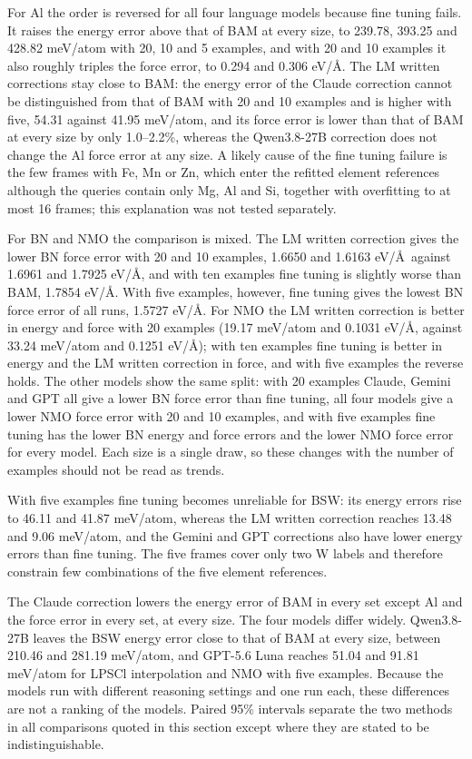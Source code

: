 For Al the order is reversed for all four language models because fine tuning fails. It raises the energy error above that of BAM at every size, to 239.78, 393.25 and 428.82 meV/atom with 20, 10 and 5 examples, and with 20 and 10 examples it also roughly triples the force error, to 0.294 and 0.306 eV/\AA. The LM written corrections stay close to BAM: the energy error of the Claude correction cannot be distinguished from that of BAM with 20 and 10 examples and is higher with five, 54.31 against 41.95 meV/atom, and its force error is lower than that of BAM at every size by only 1.0--2.2\%, whereas the Qwen3.8-27B correction does not change the Al force error at any size. A likely cause of the fine tuning failure is the few frames with Fe, Mn or Zn, which enter the refitted element references although the queries contain only Mg, Al and Si, together with overfitting to at most 16 frames; this explanation was not tested separately.

For BN and NMO the comparison is mixed. The LM written correction gives the lower BN force error with 20 and 10 examples, 1.6650 and 1.6163 eV/\AA\ against 1.6961 and 1.7925 eV/\AA, and with ten examples fine tuning is slightly worse than BAM, 1.7854 eV/\AA. With five examples, however, fine tuning gives the lowest BN force error of all runs, 1.5727 eV/\AA. For NMO the LM written correction is better in energy and force with 20 examples (19.17 meV/atom and 0.1031 eV/\AA, against 33.24 meV/atom and 0.1251 eV/\AA); with ten examples fine tuning is better in energy and the LM written correction in force, and with five examples the reverse holds. The other models show the same split: with 20 examples Claude, Gemini and GPT all give a lower BN force error than fine tuning, all four models give a lower NMO force error with 20 and 10 examples, and with five examples fine tuning has the lower BN energy and force errors and the lower NMO force error for every model. Each size is a single draw, so these changes with the number of examples should not be read as trends.

With five examples fine tuning becomes unreliable for BSW: its energy errors rise to 46.11 and 41.87 meV/atom, whereas the LM written correction reaches 13.48 and 9.06 meV/atom, and the Gemini and GPT corrections also have lower energy errors than fine tuning. The five frames cover only two W labels and therefore constrain few combinations of the five element references.

The Claude correction lowers the energy error of BAM in every set except Al and the force error in every set, at every size. The four models differ widely. Qwen3.8-27B leaves the BSW energy error close to that of BAM at every size, between 210.46 and 281.19 meV/atom, and GPT-5.6 Luna reaches 51.04 and 91.81 meV/atom for LPSCl interpolation and NMO with five examples. Because the models run with different reasoning settings and one run each, these differences are not a ranking of the models. Paired 95\% intervals separate the two methods in all comparisons quoted in this section except where they are stated to be indistinguishable.

